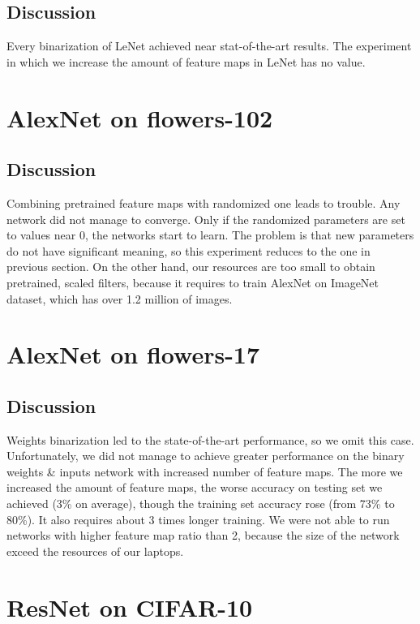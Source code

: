 \documentclass[licencjacka]{pracamgr}
\begin{document}
	\subsection{Discussion}
	Every binarization of LeNet achieved near stat-of-the-art results. The experiment in which we increase the amount of feature maps in LeNet has no value.
	\section{AlexNet on flowers-102}
	\subsection{Discussion}
	Combining pretrained feature maps with randomized one leads to trouble. Any network did not manage to converge. Only if the randomized parameters are set to values near 0, the networks start to learn. The problem is that new parameters do not have significant meaning, so this experiment reduces to the one in previous section. On the other hand, our resources are too small to obtain pretrained, scaled filters, because it requires to train AlexNet on ImageNet dataset, which has over 1.2 million of images.
	\section{AlexNet on flowers-17}
	\subsection{Discussion}
	Weights binarization led to the state-of-the-art performance, so we omit this case. Unfortunately, we did not manage to achieve greater performance on the binary weights \& inputs network with increased number of feature maps. The more we increased the amount of feature maps, the worse accuracy on testing set we achieved (3\% on average), though the training set accuracy rose (from 73\% to 80\%). It also requires about 3 times longer training.  We were not able to run networks with higher feature map ratio than 2, because the size of the network exceed the resources of our laptops.
	\section{ResNet on CIFAR-10}
\end{document}
